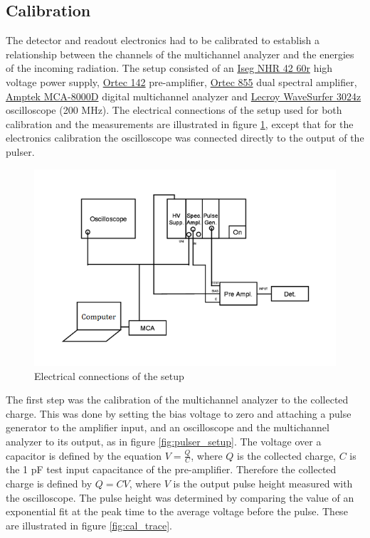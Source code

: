 \documentclass[a4paper]{article}
\begin{document}
\clearpage
\subsection{Calibration}
\label{setup_calibration}
The detector and readout electronics had to be calibrated to establish a relationship between the channels of the multichannel analyzer and the energies of the incoming radiation.
The setup consisted of an
\href{https://iseg-hv.com/en/products/detail/NHR}{Iseg NHR 42 60r}
high voltage power supply,
\href{https://www.ortec-online.com/products/electronics/preamplifiers/142a-b-c}{Ortec 142}
pre-amplifier,
\href{https://www.ortec-online.com/products/electronics/amplifiers/855}{Ortec 855}
dual spectral amplifier,
\href{https://www.amptek.com/products/multichannel-analyzers/mca-8000d-digital-multichannel-analyzer}{Amptek MCA-8000D}
digital multichannel analyzer and
\href{https://teledynelecroy.com/oscilloscope/wavesurfer-3000z-oscilloscopes/wavesurfer-3024z}{Lecroy WaveSurfer 3024z} oscilloscope (200 MHz).
The electrical connections of the setup used for both calibration and the measurements are illustrated in figure \ref{fig:connections}, except that for the electronics calibration the oscilloscope was connected directly to the output of the pulser.

\begin{figure}[ht!]
\centering
\includegraphics[width=\textwidth]{fig/instructions/connections.png}
\caption{Electrical connections of the setup \cite{instructions}}
\label{fig:connections}
\end{figure}

\FloatBarrier
The first step was the calibration of the multichannel analyzer to the collected charge.
This was done by setting the bias voltage to zero and attaching a pulse generator to the amplifier input, and an oscilloscope and the multichannel analyzer to its output, as in figure \ref{fig:pulser_setup}.
The voltage over a capacitor is defined by the equation $V = \frac{Q}{C}$, where $Q$ is the collected charge, $C$ is the 1 pF test input capacitance of the pre-amplifier.
Therefore the collected charge is defined by $Q = CV$, where $V$ is the output pulse height measured with the oscilloscope.
The pulse height was determined by comparing the value of an exponential fit at the peak time to the average voltage before the pulse.
These are illustrated in figure \ref{fig:cal_trace}.
\end{document}
